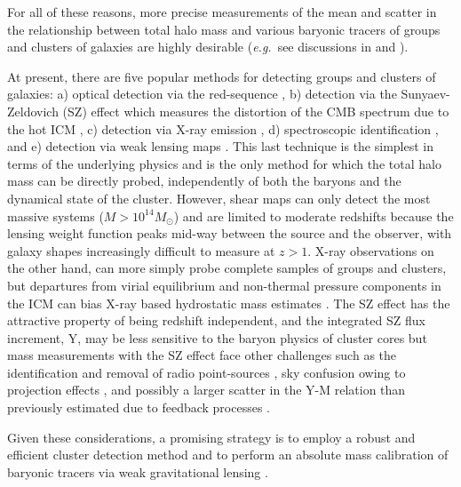 \documentclass[12pt]{emulateapj}
\newcommand{\eg}{{\it e.g.}}
\begin{document}
For all of these reasons, more precise measurements of the mean and
scatter in the relationship between total halo mass and various
baryonic tracers of groups and clusters of galaxies are highly
desirable (\eg\ see discussions in \citet{Voit:2005} and
\citet{Albrecht:2006}).

At present, there are five popular methods for detecting groups and
clusters of galaxies: a) optical detection via the red-sequence
\citep[\eg][]{Gladders:2005,Koester:2007}, b) detection via the
Sunyaev-Zeldovich (SZ) effect which measures the distortion of the CMB
spectrum due to the hot ICM
\citep[\eg][]{Sunyaev:1970,Sunyaev:1972,Carlstrom:2002,Benson:2004,Staniszewski:2008},
c) detection via X-ray emission
\citep[\eg][]{Bohringer:2000,Hasinger:2001,Finoguenov:2007,
  Vikhlinin:2008}, d) spectroscopic identification
\citep[\eg][]{Gerke:2005,Miller:2005,Knobel:2009}, and e) detection
via weak lensing maps
\citep[\eg][]{Marian:2006,Miyazaki:2007,Massey:2007a}. This last
technique is the simplest in terms of the underlying physics and is
the only method for which the total halo mass can be directly probed,
independently of both the baryons and the dynamical state of the
cluster. However, shear maps can only detect the most massive systems
($M>10^{14} M_{\odot}$) and are limited to moderate redshifts because
the lensing weight function peaks mid-way between the source and the
observer, with galaxy shapes increasingly difficult to measure at
$z>1$. X-ray observations on the other hand, can more simply probe
complete samples of groups and clusters, but departures from virial
equilibrium and non-thermal pressure components in the ICM can bias
X-ray based hydrostatic mass estimates \citep[\eg][]{Nagai:2007}. The
SZ effect has the attractive property of being redshift independent,
and the integrated SZ flux increment, Y, may be less sensitive to the
baryon physics of cluster cores \citep[][]{Motl:2005,Nagai:2006} but
mass measurements with the SZ effect face other challenges such as the
identification and removal of radio point-sources
\citep[][]{Vale:2006}, sky confusion owing to projection effects
\citep{White:2002a}, and possibly a larger scatter in the Y-M relation
than previously estimated due to feedback processes
\citep[][]{Shaw:2008}.

Given these considerations, a promising strategy is to employ a robust
and efficient cluster detection method \citep[to which the ultimate
solution may be a combination of several techniques such as described
in][]{Cohn:2009} and to perform an absolute mass calibration of
baryonic tracers via weak gravitational lensing
\citep[][]{Hoekstra:2007a,Rykoff:2008,Berge:2008}.
\end{document}
